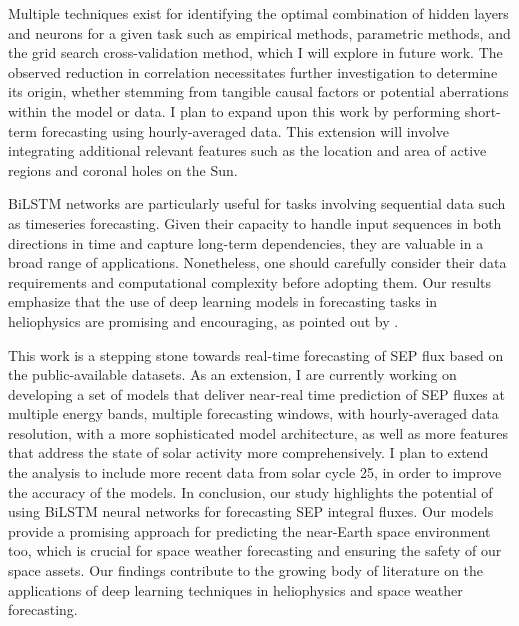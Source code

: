 Multiple techniques exist for identifying the optimal combination of hidden layers and neurons for a given task such as empirical methods, parametric methods, and the grid search cross-validation method, which I will explore in future work.
The observed reduction in correlation necessitates further investigation to determine its origin, whether stemming from tangible causal factors or potential aberrations within the model or data.
I plan to expand upon this work by performing short-term forecasting using hourly-averaged data. This extension will involve integrating additional relevant features such as the location and area of active regions and coronal holes on the Sun.

BiLSTM networks are particularly useful for tasks involving sequential data such as timeseries forecasting. Given their capacity to handle input sequences in both directions in time and capture long-term dependencies, they are valuable in a broad range of applications. Nonetheless, one should carefully consider their data requirements and computational complexity before adopting them.
Our results emphasize that the use of deep learning models in forecasting tasks in heliophysics are promising and encouraging, as pointed out by \citet{zhang_lstm_2022}.

This work is a stepping stone towards real-time forecasting of SEP flux based on the public-available datasets. As an extension, I are currently working on developing a set of models that deliver near-real time prediction of SEP fluxes at multiple energy bands, multiple forecasting windows, with hourly-averaged data resolution, with a more sophisticated model architecture, as well as more features that address the state of solar activity more comprehensively. 
I plan to extend the analysis to include more recent data from solar cycle 25, in order to improve the accuracy of the models.
In conclusion, our study highlights the potential of using BiLSTM neural networks for forecasting SEP integral fluxes. Our models provide a promising approach for predicting the near-Earth space environment too, which is crucial for space weather forecasting and ensuring the safety of our space assets. Our findings contribute to the growing body of literature on the applications of deep learning techniques in heliophysics and space weather forecasting.
